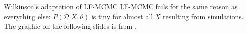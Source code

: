 \documentclass[12pt,a4paper,t,xcolor=dvipsnames,slidestop,compress,mathserif]{beamer}
\begin{document}
\begin{frame}{Wilkinson's adaptation of LF-MCMC}
LF-MCMC fails for the same reason as everything else: $P(\mathcal{D}|X, \theta)$ is tiny for almost all $X$ resulting from simulations.\\
\phantom{0}
The graphic on the following slides is from \cite{FinkeSMCslides}.
\end{frame}

\end{document}
